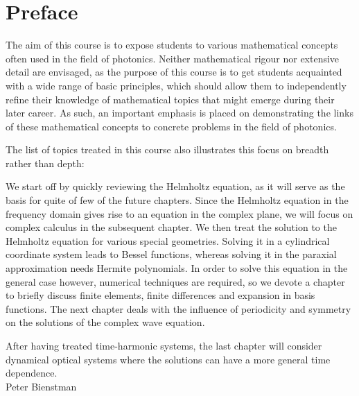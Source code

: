 \chapter{Preface}
\label{h:Preface}

The aim of this course is to expose students to various mathematical concepts often used in the field of photonics. Neither mathematical rigour nor extensive detail are envisaged, as the purpose of this course is to get students acquainted with a wide range of basic principles, which should allow them to independently refine their knowledge of mathematical topics that might emerge during their later career. As such, an important emphasis is placed on demonstrating the links of these mathematical concepts to concrete problems in the field of photonics.

The list of topics treated in this course also illustrates this focus on breadth rather than depth:

We start off by quickly reviewing the Helmholtz equation, as it will serve as the basis for quite of few of the future chapters. Since the Helmholtz equation in the frequency domain gives rise to an equation in the complex plane, we will focus on complex calculus in the subsequent chapter. We then treat the solution to the Helmholtz equation for various special geometries. Solving it in a cylindrical coordinate system leads to Bessel functions, whereas solving it in the paraxial approximation needs Hermite polynomials. In order to solve this equation in the general case however, numerical techniques are required, so we devote a chapter to briefly discuss finite elements, finite differences and expansion in basis functions. The next chapter deals with the influence of periodicity and symmetry on the solutions of the complex wave equation.

After having treated time-harmonic systems, the last chapter will consider dynamical optical systems where the solutions can have a more general time dependence.\\[1cm]

\hspace{10cm} Peter Bienstman

